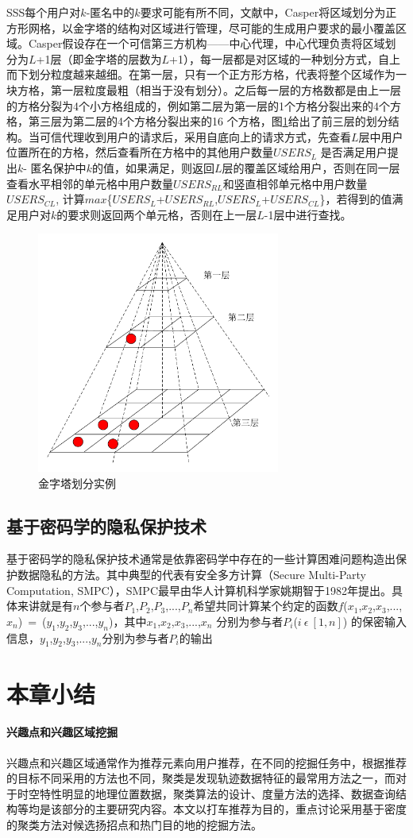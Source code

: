 SSS每个用户对$k$-匿名中的$k$要求可能有所不同，文献\cite{Mokbel}中，Casper将区域划分为正方形网格，以金字塔的结构对区域进行管理，尽可能的生成用户要求的最小覆盖区域。Casper假设存在一个可信第三方机构——中心代理，中心代理负责将区域划分为$L$+1层（即金字塔的层数为$L$+1），每一层都是对区域的一种划分方式，自上而下划分粒度越来越细。在第一层，只有一个正方形方格，代表将整个区域作为一块方格，第一层粒度最粗（相当于没有划分）。之后每一层的方格数都是由上一层的方格分裂为4个小方格组成的，例如第二层为第一层的1个方格分裂出来的4个方格，第三层为第二层的4个方格分裂出来的16 个方格，图\ref{fig:GoldTower_pdf}给出了前三层的划分结构。当可信代理收到用户的请求后，采用自底向上的请求方式，先查看$L$层中用户位置所在的方格，然后查看所在方格中的其他用户数量$USERS_L$ 是否满足用户提出$k$- 匿名保护中$k$的值，如果满足，则返回$L$层的覆盖区域给用户，否则在同一层查看水平相邻的单元格中用户数量$USERS_{RL}$和竖直相邻单元格中用户数量$USERS_{CL}$, 计算$max$\{$USERS_L$+$USERS_{RL}$,$USERS_L$+$USERS_{CL}$\}，若得到的值满足用户对$k$的要求则返回两个单元格，否则在上一层$L$-1层中进行查找。
\begin{figure}[H]
\centering
\includegraphics[width=8cm]{fig/GoldTower.pdf}
\caption{金字塔划分实例} %
\label{fig:GoldTower_pdf}
\end{figure}
\subsection{基于密码学的隐私保护技术}
基于密码学的隐私保护技术通常是依靠密码学中存在的一些计算困难问题构造出保护数据隐私的方法。其中典型的代表有安全多方计算（Secure Multi-Party Computation, SMPC），SMPC最早由华人计算机科学家姚期智于1982年提出\cite{}。具体来讲就是有$n$个参与者$P_1$,$P_2$,$P_3$,...,$P_n$希望共同计算某个约定的函数$f$($x_1$,$x_2$,$x_3$,...,$x_n$)~=~($y_1$,$y_2$,$y_3$,...,$y_n$)，其中$x_1$,$x_2$,$x_3$,...,$x_n$ 分别为参与者$P_i$($i ~\epsilon ~[1,n]$) 的保密输入信息，$y_1$,$y_2$,$y_3$,...,$y_n$分别为参与者$P_i$的输出

\section{本章小结}
\paragraph{兴趣点和兴趣区域挖掘}

兴趣点和兴趣区域通常作为推荐元素向用户推荐，在不同的挖掘任务中，根据推荐的目标不同采用的方法也不同，聚类是发现轨迹数据特征的最常用方法之一，而对于时空特性明显的地理位置数据，聚类算法的设计、度量方法的选择、数据查询结构等均是该部分的主要研究内容。本文以打车推荐为目的，重点讨论采用基于密度的聚类方法对候选扬招点和热门目的地的挖掘方法。


